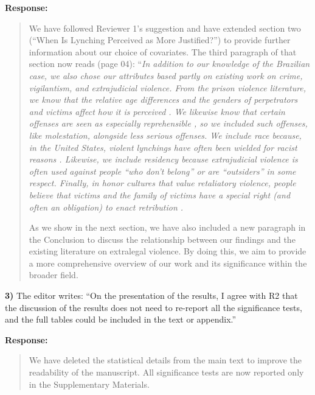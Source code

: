 \documentclass[a4paper,12pt]{article}
\begin{document}
\vspace{.3cm}

\noindent \textbf{Response:} 
\begin{quote}

We have followed Reviewer 1's suggestion and have extended section two (``When
Is Lynching Perceived as More Justified?'') to provide further information
about our choice of covariates. The third paragraph of that section now reads
(page 04): ``\textit{In addition to our knowledge of the Brazilian case, we
  also chose our attributes based partly on existing work on crime,
  vigilantism, and extrajudicial violence. From the prison violence literature,
  we know that the relative age differences and the genders of perpetrators and
  victims affect how it is perceived \citep{fleisher2009myth}. We likewise know
  that certain offenses are seen as especially reprehensible
  \citep{skarbek2014social}, so we included such offenses, like molestation,
  alongside less serious offenses. We include race because, in the United
  States, violent lynchings have often been wielded for racist reasons
  \citep{dray2003hands}. Likewise, we include residency because extrajudicial
  violence is often used against people ``who don't belong'' or are
  ``outsiders'' in some respect. Finally, in honor cultures that value
  retaliatory violence, people believe that victims and the family of victims
  have a special right (and often an obligation) to enact retribution
\citep{weiner2013rule}.}

As we show in the next section, we have also included a new paragraph in the
Conclusion to discuss the relationship between our findings and the existing
literature on extralegal violence. By doing this, we aim to provide a more
comprehensive overview of our work and its significance within the broader
field.

\end{quote}

\vspace{.3cm}

\noindent \textbf{3)} The editor writes: ``On the presentation of the results,
I agree with R2 that the discussion of the results does not need to re-report
all the significance tests, and the full tables could be included in the text
or appendix.''

\vspace{.3cm}

\noindent \textbf{Response:} 
\begin{quote}

We have deleted the statistical details from the main text to improve the
readability of the manuscript. All significance tests are now reported only in
the Supplementary Materials.

\end{quote}
\end{document}
